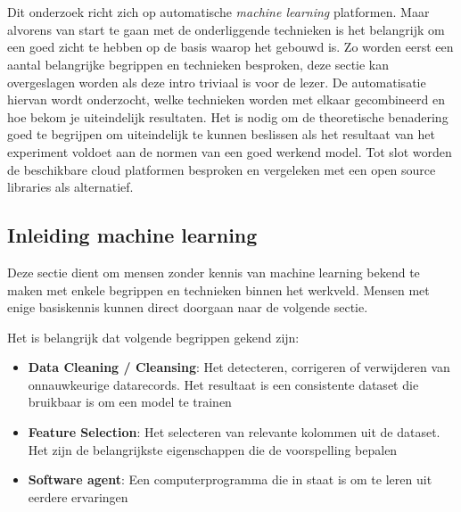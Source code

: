 \chapter{}
\label{ch:stand-van-zaken}



Dit onderzoek richt zich op automatische \textit{machine learning} platformen. Maar alvorens van start te gaan met de onderliggende technieken is het belangrijk om een goed zicht te hebben op de basis waarop het gebouwd is. Zo worden eerst een aantal belangrijke begrippen en technieken besproken, deze sectie kan overgeslagen worden als deze intro triviaal is voor de lezer. De automatisatie hiervan wordt onderzocht, welke technieken worden met elkaar gecombineerd en hoe bekom je uiteindelijk resultaten. Het is nodig om de theoretische benadering goed te begrijpen om uiteindelijk te kunnen beslissen als het resultaat van het experiment voldoet aan de normen van een goed werkend model. Tot slot worden de beschikbare cloud platformen besproken en vergeleken met een open source libraries als alternatief.

\section{Inleiding machine learning}
\label{sec:inl-machine-learning}

Deze sectie dient om mensen zonder kennis van machine learning bekend te maken met enkele begrippen en technieken binnen het werkveld. Mensen met enige basiskennis kunnen direct doorgaan naar de volgende sectie.

Het is belangrijk dat volgende begrippen gekend zijn:
\begin{itemize}
    \item \textbf{Data Cleaning / Cleansing}: Het detecteren, corrigeren of verwijderen van onnauwkeurige datarecords. Het resultaat is een consistente dataset die bruikbaar is om een model te trainen
    \item \textbf{Feature Selection}: Het selecteren van relevante kolommen uit de dataset. Het zijn de belangrijkste eigenschappen die de voorspelling bepalen
    \item \textbf{Software agent}: Een computerprogramma die in staat is om te leren uit eerdere ervaringen
\end{itemize}

